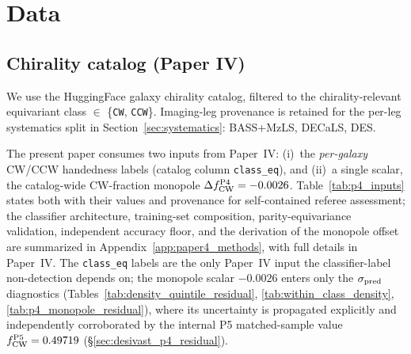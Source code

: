 \documentclass[twocolumn,linenumbers]{aastex702}
\begin{document}
\section{Data}\label{sec:data}

\subsection{Chirality catalog (Paper IV)}

We use the HuggingFace galaxy chirality catalog,
filtered to the chirality-relevant equivariant class $\in$
\{\texttt{CW}, \texttt{CCW}\}. Imaging-leg provenance is retained for
the per-leg systematics split in Section~\ref{sec:systematics}:
BASS+MzLS, DECaLS, DES.

The present paper consumes two inputs from Paper~IV:
(i)~the \emph{per-galaxy} CW/CCW handedness labels (catalog column
\texttt{class\_eq}), and (ii)~a single scalar, the catalog-wide CW-fraction
monopole $\Delta f_{\rm CW}^{\rm P4} = -0.0026$. Table~\ref{tab:p4_inputs}
states both with their values and provenance for self-contained referee
assessment; the classifier architecture, training-set composition,
parity-equivariance validation, independent accuracy floor, and the
derivation of the monopole offset are summarized in
Appendix~\ref{app:paper4_methods}, with full details in Paper~IV. The
\texttt{class\_eq} labels are the only Paper~IV input the
classifier-label non-detection depends on; the monopole scalar
$-0.0026$ enters only the $\sigma_{\rm pred}$ diagnostics
(Tables~\ref{tab:density_quintile_residual},
\ref{tab:within_class_density}, \ref{tab:p4_monopole_residual}), where
its uncertainty is propagated explicitly and independently corroborated by
the internal P5 matched-sample value $f_{\rm CW}^{\rm P5} = 0.49719$
(\S\ref{sec:desivast_p4_residual}).
\end{document}
